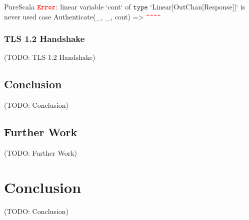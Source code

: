 \documentclass[a4paper,twoside]{article}
\newcommand{\TODO}[1]{\textcolor{YellowOrange}{(TODO: #1)}} %
\begin{document}
\begin{ShortCode}{PureScala}
$\texttt{\textbf{\textcolor{Red}{Error}}}$: linear variable `cont` of $\texttt{type}$ `Linear[OutChan[Response]]` is never used
                 case Authenticate(_, _, cont) =>
                                         $\texttt{\textbf{\textcolor{Red}{\textasciicircum\textasciicircum\textasciicircum\textasciicircum}}}$
\end{ShortCode}

\subsubsection{TLS 1.2 Handshake}

\TODO{TLS 1.2 Handshake}

\subsection{Conclusion}

\TODO{Conclusion}

\subsection{Further Work}

\TODO{Further Work}

\clearpage
\section{Conclusion}
\label{conclusion}

\TODO{Conclusion}

\appendix

\clearpage

\nocite{*}


\end{document}
